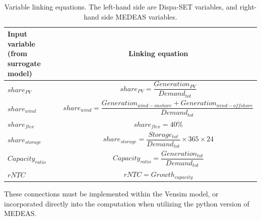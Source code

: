 \begin{table}[h]
    \centering
    \begin{tabular}{|m{3.6cm}|c|}
    \hline 
    Input variable (from surrogate model) & Linking equation \\ \hline
    $share_{PV}$ & $share_{PV}=\dfrac{Generation_{PV}}{Demand_{tot}}$ \\ \hline 
    $share_{wind}$ & $share_{wind}=\dfrac{Generation_{wind-onshore} + Generation_{wind-offshore}}{Demand_{tot}}$ \\ \hline 
    $share_{flex}$ & $share_{flex}=40\%$ \\ \hline 
    $share_{storage}$ & $share_{storage}=\dfrac{Storage_{tot}}{Demand_{tot}}\times 365\times 24$ \\ \hline 
    $Capacity_{ratio}$ & $Capacity_{ratio}=\dfrac{Generation_{tot}}{Demand_{tot}}$ \\ \hline 
    $rNTC$ & $rNTC= Growth_{capacity}$ \\ \hline 
    \end{tabular}
    \caption{Variable linking equations. The left-hand side are Dispa-SET variables, and right-hand side MEDEAS variables.}
    \label{tab:linking-equations}
\end{table}

These connections must be implemented within the Vensim model, or incorporated directly into the computation when utilizing the python version of MEDEAS.